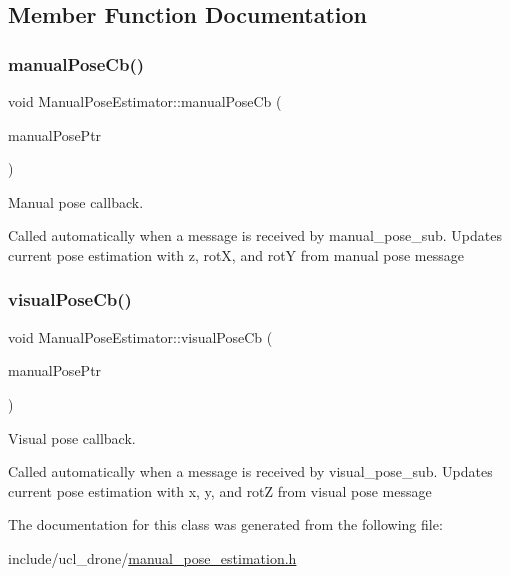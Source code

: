 \subsection{Member Function Documentation}
\mbox{\label{classManualPoseEstimator_a1aa19bbcb80a687fa0b9416ee272cdbd}} 
\subsubsection{\texorpdfstring{manual\+Pose\+Cb()}{manualPoseCb()}}
{\footnotesize\ttfamily void Manual\+Pose\+Estimator\+::manual\+Pose\+Cb (\begin{DoxyParamCaption}\item[{const ucl\+\_\+drone\+::\+Pose3\+D\+::\+Const\+Ptr}]{manual\+Pose\+Ptr }\end{DoxyParamCaption})\hspace{0.3cm}{\ttfamily [private]}}



Manual pose callback. 

Called automatically when a message is received by manual\+\_\+pose\+\_\+sub. Updates current pose estimation with z, rotX, and rotY from manual pose message \mbox{\label{classManualPoseEstimator_a77e0e96d37601fefa3dd0ac306081723}} 
\subsubsection{\texorpdfstring{visual\+Pose\+Cb()}{visualPoseCb()}}
{\footnotesize\ttfamily void Manual\+Pose\+Estimator\+::visual\+Pose\+Cb (\begin{DoxyParamCaption}\item[{const ucl\+\_\+drone\+::\+Pose3\+D\+::\+Const\+Ptr}]{manual\+Pose\+Ptr }\end{DoxyParamCaption})\hspace{0.3cm}{\ttfamily [private]}}



Visual pose callback. 

Called automatically when a message is received by visual\+\_\+pose\+\_\+sub. Updates current pose estimation with x, y, and rotZ from visual pose message 

The documentation for this class was generated from the following file\+:\begin{DoxyCompactItemize}
\item 
include/ucl\+\_\+drone/\hyperlink{manual__pose__estimation_8h}{manual\+\_\+pose\+\_\+estimation.\+h}\end{DoxyCompactItemize}
